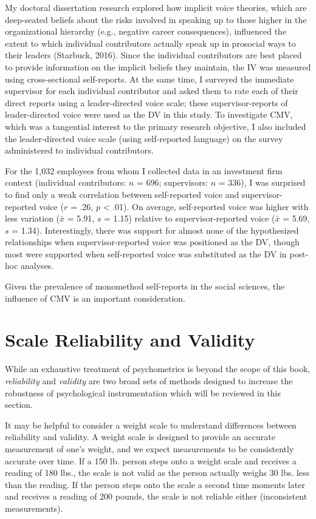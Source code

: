 \documentclass[
]{book}
\begin{document}
My doctoral dissertation research explored how implicit voice theories, which are deep-seated beliefs about the risks involved in speaking up to those higher in the organizational hierarchy (e.g., negative career consequences), influenced the extent to which individual contributors actually speak up in prosocial ways to their leaders (Starbuck, 2016). Since the individual contributors are best placed to provide information on the implicit beliefs they maintain, the IV was measured using cross-sectional self-reports. At the same time, I surveyed the immediate supervisor for each individual contributor and asked them to rate each of their direct reports using a leader-directed voice scale; these supervisor-reports of leader-directed voice were used as the DV in this study. To investigate CMV, which was a tangential interest to the primary research objective, I also included the leader-directed voice scale (using self-reported language) on the survey administered to individual contributors.

For the 1,032 employees from whom I collected data in an investment firm context (individual contributors: \(n\) = 696; supervisors: \(n\) = 336), I was surprised to find only a weak correlation between self-reported voice and supervisor-reported voice (\(r\) = .26, \(p\) \textless{} .01). On average, self-reported voice was higher with less variation (\(\bar{x}\) = 5.91, \(s\) = 1.15) relative to supervisor-reported voice (\(\bar{x}\) = 5.69, \(s\) = 1.34). Interestingly, there was support for almost none of the hypothesized relationships when supervisor-reported voice was positioned as the DV, though most were supported when self-reported voice was substituted as the DV in post-hoc analyses.

Given the prevalence of monomethod self-reports in the social sciences, the influence of CMV is an important consideration.

\hypertarget{scale-reliability-and-validity}{%
\section{Scale Reliability and Validity}\label{scale-reliability-and-validity}}

While an exhaustive treatment of psychometrics is beyond the scope of this book, \emph{reliability} and \emph{validity} are two broad sets of methods designed to increase the robustness of psychological instrumentation which will be reviewed in this section.

It may be helpful to consider a weight scale to understand differences between reliability and validity. A weight scale is designed to provide an accurate measurement of one's weight, and we expect measurements to be consistently accurate over time. If a 150 lb. person steps onto a weight scale and receives a reading of 180 lbs., the scale is not valid as the person actually weighs 30 lbs. less than the reading. If the person steps onto the scale a second time moments later and receives a reading of 200 pounds, the scale is not reliable either (inconsistent measurements).
\end{document}
